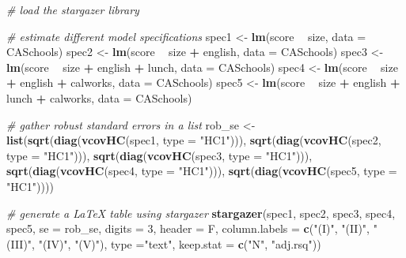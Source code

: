 \documentclass[]{book}
\newenvironment{Shaded}{\begin{snugshade}}{\end{snugshade}}
\newcommand{\CommentTok}[1]{\textcolor[rgb]{0.56,0.35,0.01}{\textit{#1}}}
\newcommand{\DataTypeTok}[1]{\textcolor[rgb]{0.13,0.29,0.53}{#1}}
\newcommand{\DecValTok}[1]{\textcolor[rgb]{0.00,0.00,0.81}{#1}}
\newcommand{\KeywordTok}[1]{\textcolor[rgb]{0.13,0.29,0.53}{\textbf{#1}}}
\newcommand{\NormalTok}[1]{#1}
\newcommand{\OperatorTok}[1]{\textcolor[rgb]{0.81,0.36,0.00}{\textbf{#1}}}
\newcommand{\StringTok}[1]{\textcolor[rgb]{0.31,0.60,0.02}{#1}}
\begin{document}
\begin{Shaded}
\begin{Highlighting}[]
\CommentTok{# load the stargazer library}

\CommentTok{# estimate different model specifications}
\NormalTok{spec1 <-}\StringTok{ }\KeywordTok{lm}\NormalTok{(score }\OperatorTok{~}\StringTok{ }\NormalTok{size, }\DataTypeTok{data =}\NormalTok{ CASchools)}
\NormalTok{spec2 <-}\StringTok{ }\KeywordTok{lm}\NormalTok{(score }\OperatorTok{~}\StringTok{ }\NormalTok{size }\OperatorTok{+}\StringTok{ }\NormalTok{english, }\DataTypeTok{data =}\NormalTok{ CASchools)}
\NormalTok{spec3 <-}\StringTok{ }\KeywordTok{lm}\NormalTok{(score }\OperatorTok{~}\StringTok{ }\NormalTok{size }\OperatorTok{+}\StringTok{ }\NormalTok{english }\OperatorTok{+}\StringTok{ }\NormalTok{lunch, }\DataTypeTok{data =}\NormalTok{ CASchools)}
\NormalTok{spec4 <-}\StringTok{ }\KeywordTok{lm}\NormalTok{(score }\OperatorTok{~}\StringTok{ }\NormalTok{size }\OperatorTok{+}\StringTok{ }\NormalTok{english }\OperatorTok{+}\StringTok{ }\NormalTok{calworks, }\DataTypeTok{data =}\NormalTok{ CASchools)}
\NormalTok{spec5 <-}\StringTok{ }\KeywordTok{lm}\NormalTok{(score }\OperatorTok{~}\StringTok{ }\NormalTok{size }\OperatorTok{+}\StringTok{ }\NormalTok{english }\OperatorTok{+}\StringTok{ }\NormalTok{lunch }\OperatorTok{+}\StringTok{ }\NormalTok{calworks, }\DataTypeTok{data =}\NormalTok{ CASchools)}

\CommentTok{# gather robust standard errors in a list}
\NormalTok{rob_se <-}\StringTok{ }\KeywordTok{list}\NormalTok{(}\KeywordTok{sqrt}\NormalTok{(}\KeywordTok{diag}\NormalTok{(}\KeywordTok{vcovHC}\NormalTok{(spec1, }\DataTypeTok{type =} \StringTok{"HC1"}\NormalTok{))),}
               \KeywordTok{sqrt}\NormalTok{(}\KeywordTok{diag}\NormalTok{(}\KeywordTok{vcovHC}\NormalTok{(spec2, }\DataTypeTok{type =} \StringTok{"HC1"}\NormalTok{))),}
               \KeywordTok{sqrt}\NormalTok{(}\KeywordTok{diag}\NormalTok{(}\KeywordTok{vcovHC}\NormalTok{(spec3, }\DataTypeTok{type =} \StringTok{"HC1"}\NormalTok{))),}
               \KeywordTok{sqrt}\NormalTok{(}\KeywordTok{diag}\NormalTok{(}\KeywordTok{vcovHC}\NormalTok{(spec4, }\DataTypeTok{type =} \StringTok{"HC1"}\NormalTok{))),}
               \KeywordTok{sqrt}\NormalTok{(}\KeywordTok{diag}\NormalTok{(}\KeywordTok{vcovHC}\NormalTok{(spec5, }\DataTypeTok{type =} \StringTok{"HC1"}\NormalTok{))))}

\CommentTok{# generate a LaTeX table using stargazer}
\KeywordTok{stargazer}\NormalTok{(spec1, spec2, spec3, spec4, spec5,}
          \DataTypeTok{se =}\NormalTok{ rob_se,}
          \DataTypeTok{digits =} \DecValTok{3}\NormalTok{,}
          \DataTypeTok{header =}\NormalTok{ F,}
          \DataTypeTok{column.labels =} \KeywordTok{c}\NormalTok{(}\StringTok{"(I)"}\NormalTok{, }\StringTok{"(II)"}\NormalTok{, }\StringTok{"(III)"}\NormalTok{, }\StringTok{"(IV)"}\NormalTok{, }\StringTok{"(V)"}\NormalTok{),}
          \DataTypeTok{type =}\StringTok{"text"}\NormalTok{, }
          \DataTypeTok{keep.stat =} \KeywordTok{c}\NormalTok{(}\StringTok{"N"}\NormalTok{, }\StringTok{"adj.rsq"}\NormalTok{))}
\end{Highlighting}
\end{Shaded}
\end{document}
